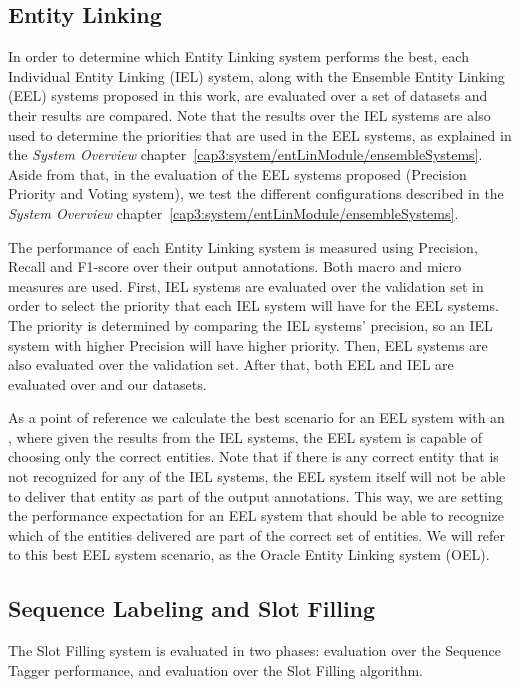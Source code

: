 \subsection{Entity Linking}
\label{cap4:experimentalDesign/entityLinking}
In order to determine which Entity Linking system performs the best, each Individual Entity 
Linking (IEL) system, along with the Ensemble Entity Linking (EEL) systems proposed in this work, 
are evaluated over a set of datasets and their results are compared. Note that the results over 
the IEL systems are also used to determine the priorities that are used in the EEL systems, as 
explained in the \textit{System Overview} chapter~\ref{cap3:system/entLinModule/ensembleSystems}. 
Aside from that, in the evaluation of 
the EEL systems proposed (Precision Priority and Voting system), we test the different 
configurations described in the \textit{System Overview} chapter~\ref{cap3:system/entLinModule/ensembleSystems}. 

The performance of each Entity Linking system is measured using Precision, Recall and F1-score 
over their output annotations. Both macro and micro measures are used. First, IEL systems are 
evaluated over the \LCQuADtwo{} validation set in order to select the priority that each IEL system 
will have for the EEL systems. The priority is determined by comparing the IEL systems’ precision, 
so an IEL system with higher Precision will have higher priority. Then, EEL systems are also 
evaluated over the \LCQuADtwo{} validation set. After that, both EEL and IEL are evaluated over 
\QALDseven{} and our \WikiSPARQL{} datasets.

As a point of reference we calculate the best scenario for an EEL system with an , 
where given the results from the IEL systems, the EEL system is capable of choosing only the 
correct entities. Note that if there is any correct entity that is not recognized for any of the 
IEL systems, the EEL system itself will not be able to deliver that entity as part of the output 
annotations. This way, we are setting the performance expectation for an EEL system that should 
be able to recognize which of the entities delivered are part of the correct set of entities. We 
will refer to this best EEL system scenario, as the Oracle Entity Linking system (OEL).


\subsection{Sequence Labeling and Slot Filling}
\label{cap4:experimentalDesign/seqLabAndSlotFilling}
The Slot Filling system is evaluated in two phases: evaluation over the Sequence Tagger 
performance, and evaluation over the Slot Filling algorithm. 

